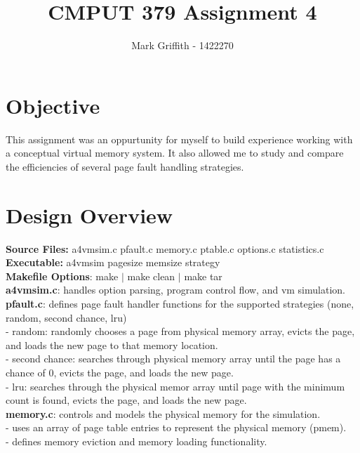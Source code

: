 \documentclass{article}
\begin{document}
\title{CMPUT 379 Assignment 4}
\author{Mark Griffith - 1422270}

\maketitle

\section{Objective}
This assignment was an oppurtunity for myself to build experience
working with a conceptual virtual memory system. It also allowed me to
study and compare the efficiencies of several page fault handling strategies.

\section{Design Overview}

\textbf{Source Files:} a4vmsim.c pfault.c memory.c ptable.c options.c statistics.c \\
\textbf{Executable:} a4vmsim pagesize memsize strategy\\
\textbf{Makefile Options}: make $|$ make clean $|$ make tar \\

\noindent
\textbf{a4vmsim.c}: handles option parsing, program control flow, and vm simulation. \\

\noindent
\textbf{pfault.c}: defines page fault handler functions for the supported strategies
(none, random, second chance, lru) \\
- random: randomly chooses a page from physical memory array, evicts the page, and loads the new page
to that memory location. \\
- second chance: searches through physical memory array until the page has a chance of 0,
evicts the page, and loads the new page. \\
- lru: searches through the physical memor array until page with the minimum count is found,
evicts the page, and loads the new page. \\

\noindent
\textbf{memory.c}: controls and models the physical memory for the simulation. \\
- uses an array of page table entries to represent the physical memory (pmem). \\
- defines memory eviction and memory loading functionality. \\
\end{document}
